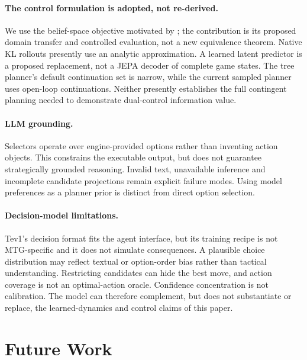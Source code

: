 \documentclass[11pt,a4paper]{article}
\theoremstyle{definition}
\theoremstyle{plain}
\begin{document}
\paragraph{The control formulation is adopted, not re-derived.} We use the belief-space objective motivated by \citet{kaufmann2026aifcontrol}; the contribution is its proposed domain transfer and controlled evaluation, not a new equivalence theorem. Native KL rollouts presently use an analytic approximation. A learned latent predictor is a proposed replacement, not a JEPA decoder of complete game states. The tree planner's default continuation set is narrow, while the current sampled planner uses open-loop continuations. Neither presently establishes the full contingent planning needed to demonstrate dual-control information value.

\paragraph{LLM grounding.} Selectors operate over engine-provided options rather than inventing action objects. This constrains the executable output, but does not guarantee strategically grounded reasoning. Invalid text, unavailable inference and incomplete candidate projections remain explicit failure modes. Using model preferences as a planner prior is distinct from direct option selection.

\paragraph{Decision-model limitations.}
Tev1's decision format fits the agent interface, but its training recipe is
not MTG-specific and it does not simulate consequences. A plausible choice
distribution may reflect textual or option-order bias rather than tactical
understanding. Restricting candidates can hide the best move, and action
coverage is not an optimal-action oracle. Confidence concentration is not
calibration. The model can therefore complement, but does not substantiate
or replace, the learned-dynamics and control claims of this paper.

\section{Future Work}
\label{sec:future}
\end{document}

